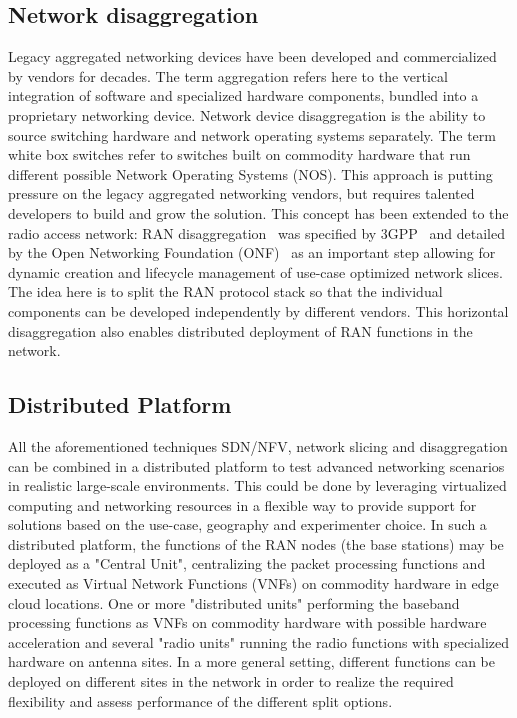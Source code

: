 \subsection{Network disaggregation}
Legacy aggregated networking devices have been developed and commercialized by vendors for decades. The term aggregation refers here to the vertical integration of software and specialized hardware components, bundled into a proprietary networking device. Network device disaggregation is the ability to source switching hardware and network operating systems separately. The term white box switches refer to switches built on commodity hardware that run different possible Network Operating Systems (NOS). This approach is putting pressure on the legacy aggregated networking vendors, but requires talented developers to build and grow the solution. This concept has been extended to the radio access network: RAN disaggregation~\cite{bonati2020open,o-ran-disaggregation} was specified by 3GPP~\cite{functional-splits} and detailed by the Open Networking Foundation (ONF)~\cite{wypior2022open} as an important step allowing for dynamic creation and lifecycle management of use-case optimized network slices. The idea here is to split the RAN protocol stack so that the individual components can be developed independently by different vendors. This horizontal disaggregation also enables distributed deployment of RAN functions in the network.

\subsection{Distributed Platform}
All the aforementioned techniques SDN/NFV, network slicing and disaggregation can be combined in a distributed platform to test advanced networking scenarios in realistic large-scale environments. This could be done by leveraging virtualized computing and networking resources in a flexible way to provide support for solutions based on the use-case, geography and experimenter choice. In such a distributed platform, the functions of the RAN nodes (the base stations) may be deployed as a "Central Unit", centralizing the packet processing functions and executed as Virtual Network Functions (VNFs) on commodity hardware in edge cloud locations. One or more "distributed units" performing the baseband processing functions as VNFs on commodity hardware with possible hardware acceleration and several "radio units" running the radio functions with specialized hardware on antenna sites. In a more general setting, different functions can be deployed on different sites in the network in order to realize the required flexibility and assess performance of the different split options.

